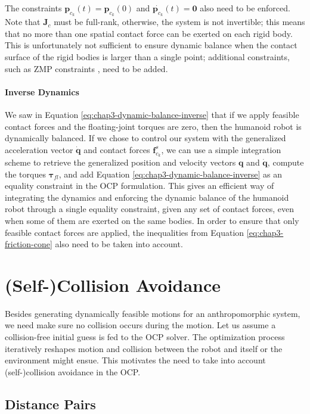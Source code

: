 The constraints $\mathbf{p}_{c_k}(t)=\mathbf{p}_{c_k}(0)$ and
$\dot{\mathbf{p}_{c_k}}(t)=\mathbf{0}$ also need to be enforced. Note
that $\mathbf{J}_{c}$ must be full-rank, otherwise, the system is not
invertible; this means that no more than one spatial contact force can
be exerted on each rigid body. This is unfortunately not sufficient to
ensure dynamic balance when the contact surface of the rigid bodies is
larger than a single point; additional constraints, such as ZMP
constraints \cite{koch2012optimization}, need to be added.

\paragraph{Inverse Dynamics}

We saw in Equation \ref{eq:chap3-dynamic-balance-inverse} that if we
apply feasible contact forces and the floating-joint torques are zero,
then the humanoid robot is dynamically balanced. If we chose to
control our system with the generalized acceleration vector
$\mathbf{\dot{q}}$ and contact forces $\mathbf{f}^s_{c_k}$, we can use
a simple integration scheme to retrieve the generalized position and
velocity vectors $\mathbf{q}$ and $\mathbf{\dot{q}}$, compute the
torques $\boldsymbol{\tau}_{fl}$, and add Equation
\ref{eq:chap3-dynamic-balance-inverse} as an equality constraint in
the OCP formulation. This gives an efficient way of integrating the
dynamics and enforcing the dynamic balance of the humanoid robot
through a single equality constraint, given any set of contact forces,
even when some of them are exerted on the same bodies. In order to
ensure that only feasible contact forces are applied, the inequalities
from Equation \ref{eq:chap3-friction-cone} also need to be taken into
account.

\section{(Self-)Collision Avoidance}

Besides generating dynamically feasible motions for an anthropomorphic
system, we need make sure no collision occurs during the motion. Let
us assume a collision-free initial guess is fed to the OCP solver. The
optimization process iteratively reshapes motion and collision between
the robot and itself or the environment might ensue. This motivates
the need to take into account (self-)collision avoidance in the OCP.

\subsection{Distance Pairs}

